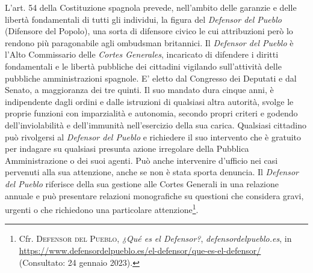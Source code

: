 \documentclass[12pt,it,a4paper,]{report}
\begin{document}
L'art. 54 della Costituzione spagnola prevede, nell'ambito delle
garanzie e delle libertà fondamentali di tutti gli individui, la figura
del \emph{Defensor del Pueblo} (Difensore del Popolo), una sorta di
difensore civico le cui attribuzioni però lo rendono più paragonabile
agli ombudsman britannici. Il \emph{Defensor del Pueblo} è l'Alto
Commissario delle \emph{Cortes Generales}, incaricato di difendere i
diritti fondamentali e le libertà pubbliche dei cittadini vigilando
sull'attività delle pubbliche amministrazioni spagnole. E' eletto dal
Congresso dei Deputati e dal Senato, a maggioranza dei tre quinti. Il
suo mandato dura cinque anni, è indipendente dagli ordini e dalle
istruzioni di qualsiasi altra autorità, svolge le proprie funzioni con
imparzialità e autonomia, secondo propri criteri e godendo
\hspace{0pt}\hspace{0pt}dell'inviolabilità e dell'immunità
nell'esercizio della sua carica. Qualsiasi cittadino può rivolgersi al
\emph{Defensor del Pueblo} e richiedere il suo intervento che è gratuito
per indagare su qualsiasi presunta azione irregolare della Pubblica
Amministrazione o dei suoi agenti. Può anche intervenire d'ufficio nei
casi pervenuti alla sua attenzione, anche se non è stata sporta
denuncia. Il \emph{Defensor del Pueblo} riferisce della sua gestione
alle Cortes Generali in una relazione annuale e può presentare relazioni
monografiche su questioni che considera gravi, urgenti o che richiedono
una particolare attenzione\footnote{Cfr. \textsc{Defensor del Pueblo},
  \emph{¿Qué es el Defensor?}, \emph{defensordelpueblo.es}, in
  \url{https://www.defensordelpueblo.es/el-defensor/que-es-el-defensor/}
  (Consultato: 24 gennaio 2023).}.
\end{document}
